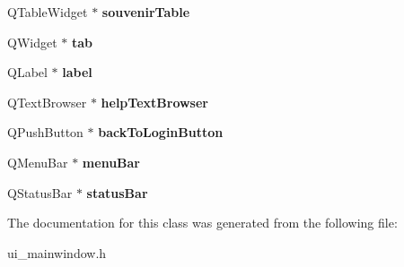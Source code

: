 \begin{DoxyCompactItemize}
\item 
\mbox{\label{class_ui___main_window_a5ba338b74df905a52cff88d140783226}} 
Q\+Table\+Widget $\ast$ {\bfseries souvenir\+Table}
\item 
\mbox{\label{class_ui___main_window_a3efc28c664e9f5115095aafbbc5ac6bc}} 
Q\+Widget $\ast$ {\bfseries tab}
\item 
\mbox{\label{class_ui___main_window_ad9c89133780f28e6efa2ec17ceb9cff5}} 
Q\+Label $\ast$ {\bfseries label}
\item 
\mbox{\label{class_ui___main_window_a23c8aadca0eed43ef89d19aa17503981}} 
Q\+Text\+Browser $\ast$ {\bfseries help\+Text\+Browser}
\item 
\mbox{\label{class_ui___main_window_aa5800f4d4be2cfb760f58ef468c53a1a}} 
Q\+Push\+Button $\ast$ {\bfseries back\+To\+Login\+Button}
\item 
\mbox{\label{class_ui___main_window_a2be1c24ec9adfca18e1dcc951931457f}} 
Q\+Menu\+Bar $\ast$ {\bfseries menu\+Bar}
\item 
\mbox{\label{class_ui___main_window_a50fa481337604bcc8bf68de18ab16ecd}} 
Q\+Status\+Bar $\ast$ {\bfseries status\+Bar}
\end{DoxyCompactItemize}


The documentation for this class was generated from the following file\+:\begin{DoxyCompactItemize}
\item 
ui\+\_\+mainwindow.\+h\end{DoxyCompactItemize}
